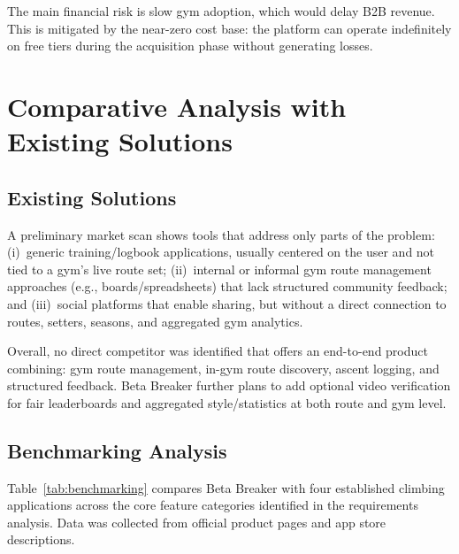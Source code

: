 \documentclass[12pt,a4paper]{report}
\renewcommand\_{\textunderscore\hspace{0pt}}
\begin{document}
The main financial risk is slow gym adoption, which would delay B2B revenue. This is mitigated by the near-zero cost base: the platform can operate indefinitely on free tiers during the acquisition phase without generating losses.

\section{Comparative Analysis with Existing Solutions}

\subsection{Existing Solutions}

A preliminary market scan shows tools that address only parts of the problem: (i)~generic training/logbook applications, usually centered on the user and not tied to a gym's live route set; (ii)~internal or informal gym route management approaches (e.g., boards/spreadsheets) that lack structured community feedback; and (iii)~social platforms that enable sharing, but without a direct connection to routes, setters, seasons, and aggregated gym analytics.

Overall, no direct competitor was identified that offers an end-to-end product combining: gym route management, in-gym route discovery, ascent logging, and structured feedback. Beta Breaker further plans to add optional video verification for fair leaderboards and aggregated style/statistics at both route and gym level.

\subsection{Benchmarking Analysis}

Table~\ref{tab:benchmarking} compares Beta Breaker with four established climbing applications across the core feature categories identified in the requirements analysis. Data was collected from official product pages and app store descriptions.
\end{document}
